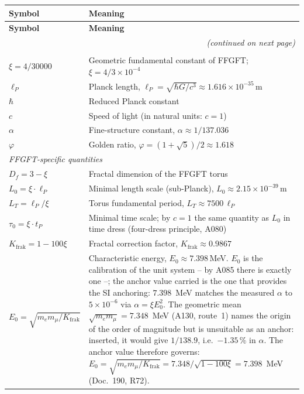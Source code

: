 \renewcommand{\arraystretch}{1.3}
{\small\setlength\tabcolsep{4pt}
\begin{longtable}{@{}p{2.6cm}p{\dimexpr\textwidth-2.8cm\relax}@{}}
\toprule
\textbf{Symbol} & \textbf{Meaning} \\
\midrule
\endfirsthead
\toprule
\textbf{Symbol} & \textbf{Meaning} \\
\midrule
\endhead
\midrule
\multicolumn{2}{r}{\textit{(continued on next page)}} \\
\endfoot
\bottomrule
\endlastfoot
\multicolumn{2}{l}{\textit{Fundamental constants and parameters}} \\
$\xi = 4/30000$ & Geometric fundamental constant of FFGFT;
  $\xi = 4/3\times10^{-4}$ \\
$\ell_P$ & Planck length, $\ell_P = \sqrt{\hbar G/c^3}
  \approx 1{.}616\times10^{-35}\,$m \\
$\hbar$ & Reduced Planck constant \\
$c$ & Speed of light (in natural units: $c=1$) \\
$\alpha$ & Fine-structure constant, $\alpha\approx1/137{.}036$ \\
$\varphi$ & Golden ratio, $\varphi=(1+\sqrt5)/2\approx1{.}618$ \\
\midrule
\multicolumn{2}{l}{\textit{FFGFT-specific quantities}} \\
$D_f = 3-\xi$ & Fractal dimension of the FFGFT torus \\
$L_0 = \xi\cdot\ell_P$ & Minimal length scale (sub-Planck),
  $L_0\approx2{.}15\times10^{-39}\,$m \\
$L_T = \ell_P/\xi$ & Torus fundamental period, $L_T\approx7500\,\ell_P$ \\
$\tau_0 = \xi\cdot t_P$ & Minimal time scale; by $c=1$ the same quantity
  as $L_0$ in time dress (four-dress principle, A080) \\
$K_\text{frak} = 1-100\xi$ & Fractal correction factor,
  $K_\text{frak}\approx0{.}9867$ \\
$E_0 = \sqrt{m_e m_\mu/K_\text{frak}}$ & Characteristic energy,
  $E_0\approx7{.}398\,$MeV. $E_0$ is the calibration of the unit system -- by A085 there is exactly one --; the anchor value carried is the one that provides the SI anchoring: $7{.}398$~MeV matches the measured $\alpha$ to $5\times10^{-6}$ via $\alpha = \xi E_0^2$. The geometric mean $\sqrt{m_em_\mu} = 7{.}348$~MeV (A130, route~1) names the origin of the order of magnitude but is unsuitable as an anchor: inserted, it would give $1/138{.}9$, i.e.\ $-1{.}35\,\%$ in $\alpha$. The anchor value therefore governs: $E_0 = \sqrt{m_em_\mu/K_\text{frak}} = 7{.}348/\sqrt{1-100\xi} = 7{.}398$~MeV (Doc.~190, R72). \\

\end{longtable}}
